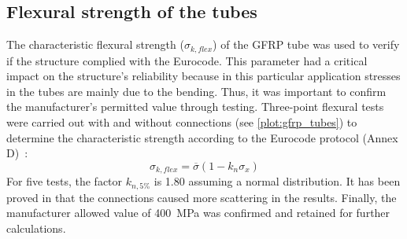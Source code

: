 
\subsection{Flexural strength of the tubes}\label{sec=flex}
The characteristic flexural strength ($\sigma_{k,flex}$) of the GFRP tube was used to verify if the structure complied with the Eurocode. This parameter had a critical impact on the structure’s reliability because in this particular application stresses in the tubes are mainly due to the bending. Thus, it was important to confirm the manufacturer’s permitted value through testing.
Three-point flexural tests were carried out with and without connections (see \cref{plot:gfrp_tubes}) to determine the characteristic strength according to the Eurocode protocol (Annex D)~:
\begin{equation}
\sigma_{k,flex}=\overline{\sigma}(1-k_n\sigma_x)
\end{equation}
For five tests, the factor $k_{n,5\%}$ is 1.80 assuming a normal distribution. It has been proved in \cite{Tayeb2015a} that the connections caused more scattering in the results. Finally, the manufacturer allowed value of \SI{400}{MPa} was confirmed and retained for further calculations.


